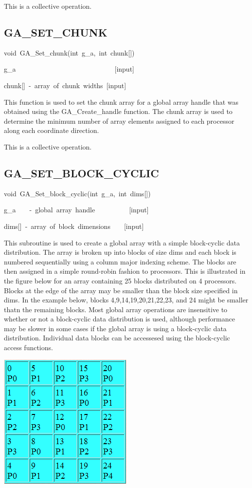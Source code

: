 This is a collective operation. 


\subsection*{\label{sub:GA_SET_CHUNK}GA\_SET\_CHUNK}
\begin{lyxcode}
void~GA\_Set\_chunk(int~g\_a,~int~chunk{[}{]})



g\_a~~~~~~~~~~~~~~~~~~~~~~~~~~~~~{[}input{]}~

chunk{[}{]}~-~array~of~chunk~widths~{[}input{]}
\end{lyxcode}
This function is used to set the chunk array for a global array handle
that was obtained using the GA\_Create\_handle function. The chunk
array is used to determine the minimum number of array elements assigned
to each processor along each coordinate direction.

This is a collective operation. 


\subsection*{\label{sub:GA_SET_BLOCK_CYCLIC}GA\_SET\_BLOCK\_CYCLIC}
\begin{lyxcode}
void~GA\_Set\_block\_cyclic(int~g\_a,~int~dims{[}{]})



g\_a~~~~-~global~array~handle~~~~~~~~~~{[}input{]}~

dims{[}{]}~-~array~of~block~dimensions~~~~{[}input{]}
\end{lyxcode}
This subroutine is used to create a global array with a simple block-cyclic
data distribution. The array is broken up into blocks of size dims
and each block is numbered sequentially using a column major indexing
scheme. The blocks are then assigned in a simple round-robin fashion
to processors. This is illustrated in the figure below for an array
containing 25 blocks distributed on 4 processors. Blocks at the edge
of the array may be smaller than the block size specified in dims.
In the example below, blocks 4,9,14,19,20,21,22,23, and 24 might be
smaller thatn the remaining blocks. Most global array operations are
insensitive to whether or not a block-cyclic data distribution is
used, although performance may be slower in some cases if the global
array is using a block-cyclic data distribution. Individual data blocks
can be accessesed using the block-cyclic access functions.

\includegraphics{Set_Block_Cyclic}

